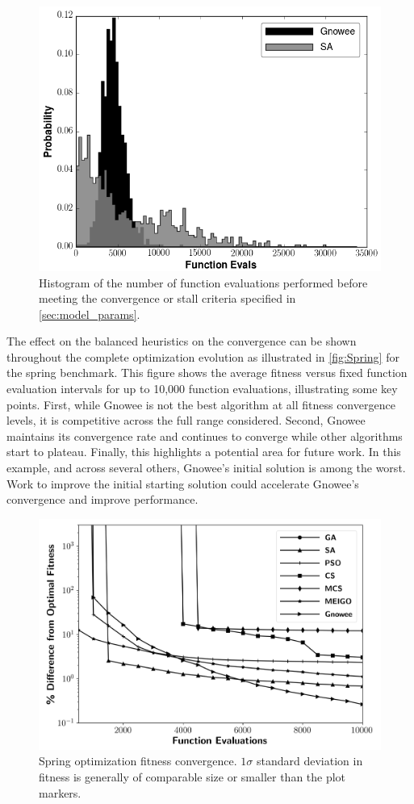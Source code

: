 \documentclass{article}                                                                           %
\begin{document}
\begin{figure}[!t]
  \centering
  \includegraphics[width=4.5in]{../figs/Spring_hist}
  \caption{Histogram of the number of function evaluations performed before meeting the convergence or stall criteria specified in \autoref{sec:model_params}.}
  \label{fig:Spring_hist}
\end{figure}


The effect on the balanced heuristics on the convergence can be shown throughout the complete optimization evolution as illustrated in  \autoref{fig:Spring} for the spring benchmark.
This figure shows the average fitness versus fixed function evaluation intervals for up to 10,000 function evaluations, illustrating some key points.
First, while Gnowee is not the best algorithm at all fitness convergence levels, it is competitive across the full range considered.
Second, Gnowee maintains its convergence rate and continues to converge while other algorithms start to plateau.
Finally, this highlights a potential area for future work.
In this example, and across several others, Gnowee's initial solution is among the worst.
Work to improve the initial starting solution could accelerate Gnowee's convergence and improve performance.

\begin{figure}[!t]
  \centering
  \includegraphics[width=4.5in]{../figs/Spring}
  \caption{Spring optimization fitness convergence. $1\sigma$ standard deviation in fitness is generally of comparable size or smaller than the plot markers.}
  \label{fig:Spring}
\end{figure}
\end{document}
